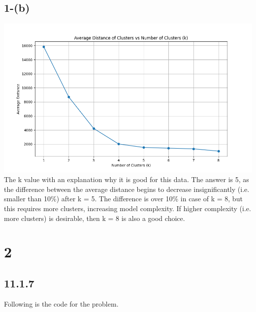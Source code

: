 \documentclass{article}
\begin{document}
\subsection*{1-(b)}
\includegraphics[scale=0.4]{cluster_plot.png}\\
The k value with an explanation why it is good for this data.
The answer is 5, as the difference between the average distance begins to decrease insignificantly (i.e. smaller than 10\%) after k = 5.
The difference is over 10\% in case of k = 8, but this requires more clusters, increasing model complexity.
If higher complexity (i.e. more clusters) is desirable, then k = 8 is also a good choice.

\section*{2}
\subsection*{11.1.7}
Following is the code for the problem.
\end{document}
